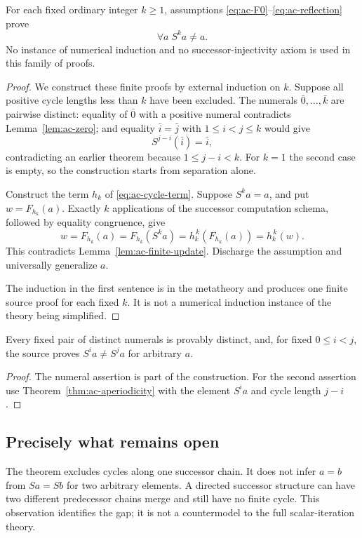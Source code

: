 \begin{theorem}
\label{thm:ac-aperiodicity}
For each fixed ordinary integer $k\ge1$, assumptions
\eqref{eq:ac-F0}--\eqref{eq:ac-reflection} prove
\[
                           \forall a\;S^k a\ne a.
\]
No instance of numerical induction and no successor-injectivity axiom is
used in this family of proofs.
\end{theorem}
\begin{proof}
We construct these finite proofs by external induction on $k$.
Suppose all positive cycle lengths less than $k$ have been excluded.
The numerals $\bar0,\ldots,\bar k$ are pairwise distinct: equality of
$\bar0$ with a positive numeral contradicts Lemma~\ref{lem:ac-zero};
and equality $\bar i=\bar j$ with $1\le i<j\le k$ would give
\[
                   S^{j-i}(\bar i)=\bar i,
\]
contradicting an earlier theorem because $1\le j-i<k$. For $k=1$ the
second case is empty, so the construction starts from separation alone.

Construct the term $h_k$ of \eqref{eq:ac-cycle-term}. Suppose
$S^k a=a$, and put $w=F_{h_k}(a)$. Exactly $k$ applications of the
successor computation schema, followed by equality congruence, give
\[
 w=F_{h_k}(a)=F_{h_k}(S^k a)=h_k^{\,k}(F_{h_k}(a))=h_k^{\,k}(w).
\]
This contradicts Lemma~\ref{lem:ac-finite-update}. Discharge the
assumption and universally generalize $a$.

The induction in the first sentence is in the metatheory and produces
one finite source proof for each fixed $k$. It is not a numerical
induction instance of the theory being simplified.
\end{proof}

\begin{corollary}
Every fixed pair of distinct numerals is provably distinct, and, for
fixed $0\le i<j$, the source proves $S^i a\ne S^j a$ for arbitrary $a$.
\end{corollary}
\begin{proof}
The numeral assertion is part of the construction. For the second
assertion use Theorem~\ref{thm:ac-aperiodicity} with the element $S^i a$
and cycle length $j-i$.
\end{proof}

\subsection{Precisely what remains open}

The theorem excludes cycles along one successor chain. It does not infer
$a=b$ from $Sa=Sb$ for two arbitrary elements. A directed successor
structure can have two different predecessor chains merge and still have
no finite cycle. This observation identifies the gap; it is not a
countermodel to the full scalar-iteration theory.


